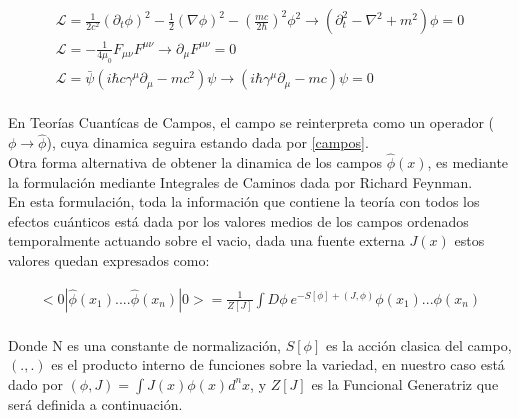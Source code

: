 \begin{equation}
\begin{array}{c}
\mathscr{L} = \frac{1}{2 c^2} (\partial _t \phi ) ^2 - \frac{1}{2} (  \nabla \phi ) ^2 - 
	\left( \frac{m c}{2 \hbar}  \right) ^2 \phi ^2 
\rightarrow 
\left(
	\partial _t ^2 - \nabla ^2 + m^2 
		\right) \phi = 0 \\[8pt]
		
\mathscr{L} = - \frac{1}{4 \mu _0} F _{\mu \nu} F ^{\mu \nu}
\rightarrow \partial _{\mu} F ^{\mu \nu} = 0 \\[8pt]

\mathscr{L} =  { \bar{\psi} } \left(
			i \hbar c \gamma ^{\mu} \partial _{\mu} - m c^2 
			\right) \psi 
\rightarrow
			\left( i \hbar  \gamma ^{\mu} \partial _{\mu}  - m c  \right)\psi = 0\\[10pt]
\end{array}
\label{campos}
\end{equation}




En Teorías Cuantícas de Campos, el campo se reinterpreta como un operador ($\phi \rightarrow \hat{\phi}$), cuya dinamica seguira estando dada por \ref{campos}. \\




Otra forma alternativa de obtener la dinamica de los campos $\hat{\phi } (x)$, es mediante la formulación mediante Integrales de Caminos dada por Richard Feynman. \\

En esta formulación, toda la información que contiene la teoría con todos los efectos cuánticos está dada por los valores medios de los campos ordenados temporalmente actuando sobre el vacio, dada una fuente externa $J(x)$ estos valores quedan expresados como:

\begin{equation}
\begin{array}{c}
< 0 | \hat{ \phi  } (x _1) .... \hat{\phi  } (x _n) | 0 > = \frac{1}{Z[J]} 
\int D \phi \ e ^{- S[ \phi ] + (J, \phi )} \phi (x _1) ... \phi (x _n) \\[10pt]
\end{array}
\label{valor}
\end{equation}

Donde N es una constante de normalización, $S[\phi]$ es la acción clasica del campo, $(.,.) $ es el producto interno de funciones sobre la variedad, en nuestro caso está dado por $(\phi,J) = \int J(x) \phi (x) d^n x$, y $Z[J]$ es la Funcional Generatriz que será definida a continuación.\\




